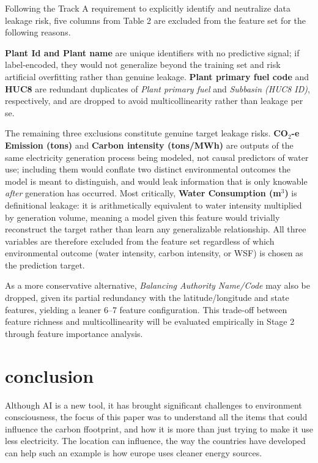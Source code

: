 \documentclass[conference]{IEEEtran}
\begin{document}
Following the Track A requirement to explicitly identify and neutralize data leakage risk, five columns from Table 2 are excluded from the feature set for the following reasons.

\textbf{Plant Id and Plant name} are unique identifiers with no predictive signal; if label-encoded, they would not generalize beyond the training set and risk artificial overfitting rather than genuine leakage. \textbf{Plant primary fuel code} and \textbf{HUC8} are redundant duplicates of \textit{Plant primary fuel} and \textit{Subbasin (HUC8 ID)}, respectively, and are dropped to avoid multicollinearity rather than leakage per se.

The remaining three exclusions constitute genuine target leakage risks. \textbf{CO$_2$-e Emission (tons)} and \textbf{Carbon intensity (tons/MWh)} are outputs of the same electricity generation process being modeled, not causal predictors of water use; including them would conflate two distinct environmental outcomes the model is meant to distinguish, and would leak information that is only knowable \textit{after} generation has occurred. Most critically, \textbf{Water Consumption (m$^3$)} is definitional leakage: it is arithmetically equivalent to water intensity multiplied by generation volume, meaning a model given this feature would trivially reconstruct the target rather than learn any generalizable relationship. All three variables are therefore excluded from the feature set regardless of which environmental outcome (water intensity, carbon intensity, or WSF) is chosen as the prediction target.

As a more conservative alternative, \textit{Balancing Authority Name/Code} may also be dropped, given its partial redundancy with the latitude/longitude and state features, yielding a leaner 6--7 feature configuration. This trade-off between feature richness and multicollinearity will be evaluated empirically in Stage 2 through feature importance analysis.

\section{conclusion}

Although AI is a new tool, it has brought significant challenges to environment consciousness, the focus of this paper was to understand all the items that could influence the carbon ffootprint, and how it is more than just trying to make it use less electricity. The location can influence, the way the countries have developed can help such an example is how europe uses cleaner energy sources.
\end{document}
